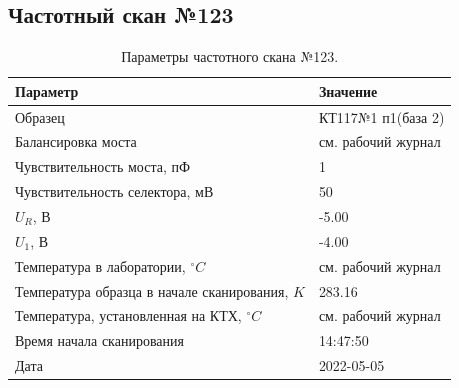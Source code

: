 \subsection{Частотный скан №123}
\begin{table}[!ht]
    \centering
    \caption{Параметры частотного скана №123.}
    \begin{tabular}{|l|l|}
        \hline
        Параметр                                       & Значение                  \\ \hline
        Образец                                        & КТ117№1 п1(база 2)        \\ \hline
        Балансировка моста                             & см. рабочий журнал        \\ \hline
        Чувствительность моста, пФ                     & 1                         \\ \hline
        Чувствительность селектора, мВ                 & 50                        \\ \hline
        $U_R$, В                                       & -5.00                     \\ \hline
        $U_1$, В                                       & -4.00                     \\ \hline
        Температура в лаборатории, $^\circ C$          & см. рабочий журнал        \\ \hline
        Температура образца в начале сканирования, $K$ & 283.16                    \\ \hline
        Температура, установленная на КТХ, $^\circ C$  & см. рабочий журнал        \\ \hline
        Время начала сканирования                      & 14:47:50                  \\ \hline
        Дата                                           & 2022-05-05                \\ \hline
    \end{tabular}
    \label{table:frequency_scan_123}
\end{table}

